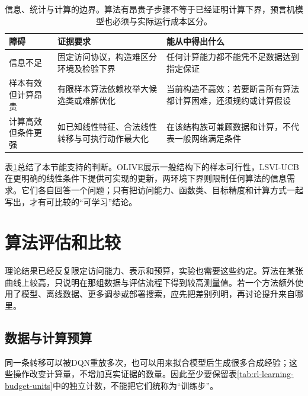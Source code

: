 \begin{table}[t]
  \centering
  \small
  \begin{tabularx}{\linewidth}{>{\raggedright\arraybackslash}p{26mm} >{\raggedright\arraybackslash}X >{\raggedright\arraybackslash}X}
    \toprule
    障碍 & 证据要求 & 能从中得出什么 \\
    \midrule
    信息不足 & 固定访问协议，构造难区分环境及检验下界 & 任何计算能力都不能凭不足数据达到指定保证 \\
    样本有效但计算昂贵 & 有限样本算法依赖枚举大候选类或难解优化 & 当前构造不高效；若要断言所有算法都计算困难，还须规约或计算假设 \\
    计算高效但条件更强 & 如已知线性特征、合法线性转移与可执行动作最大化 & 在该结构族可兼顾数据和计算，不代表一般网络满足条件 \\
    \bottomrule
  \end{tabularx}
  \caption{信息、统计与计算的边界。算法有昂贵子步骤不等于已经证明计算下界，预言机模型也必须与实际运行成本区分。}
  \label{tab:rl-learning-statistical-computational}
\end{table}

表\ref{tab:rl-learning-statistical-computational}总结了本节能支持的判断。OLIVE展示一般结构下的样本可行性，LSVI-UCB在更明确的线性条件下提供可实现的更新，两环境下界则限制任何算法的信息需求。它们各自回答一个问题；只有把访问能力、函数类、目标精度和计算方式一起写出，才有可比较的“可学习”结论。

\section{算法评估和比较}
\label{sec:rl-learning-evaluation}

理论结果已经反复限定访问能力、表示和预算，实验也需要这些约定。算法在某张曲线上较高，只说明在那组数据与评估流程下得到较高测量值。若一个方法额外使用了模型、离线数据、更多调参或部署搜索，应先把差别列明，再讨论提升来自哪里。

\subsection{数据与计算预算}
\label{sec:rl-learning-budget}

同一条转移可以被DQN重放多次，也可以用来拟合模型后生成很多合成经验；这些操作改变计算量，不增加真实证据的数量。因此至少要保留表\ref{tab:rl-learning-budget-units}中的独立计数，不能把它们统称为“训练步”。

